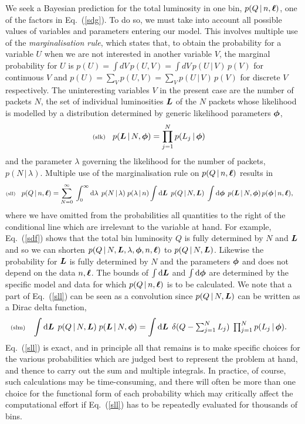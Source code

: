 \documentclass[11pt]{article}
\newcommand{\lleq}[1]{\label{#1} }
\renewcommand{\lleq}[1]{\label{#1} {\scriptstyle {\rm (#1)}} \hspace*{2ex} }
\newcommand{\cond}{\,|\,}
\newcommand{\refeq}[1]{Eq.~(\ref{#1})}
\newcommand{\rmdx}[1]{\dd{#1}} %
\begin{document}
We seek a Bayesian prediction for the total luminosity in one bin,
$p(Q\cond n,\bml)$, one of the factors in Eq.~(\ref{sdg}).  To do so,
we must take into account all possible values of variables and
parameters entering our model.  This involves multiple use of the
\textit{marginalisation rule}, which states that, to obtain the
probability for a variable $U$ when we are not interested in another
variable $V$, the marginal probability for $U$ is %
$p(U) = \int dV\,p(U,V) = \int dV\,p(U\cond V)\,p(V)$ for continuous
$V$ and $p(U) = \sum_V p(U,V) = \sum_V p(U\cond V)\,p(V)$ for discrete
$V$ respectively.
%
The uninteresting variables $V$ in the present case are the number of
packets $N$, the set of individual luminosities ${\bm{L}}$ of the $N$ packets
whose likelihood is modelled by a distribution determined by
generic likelihood parameters ${\bm{\phi}}$,
\begin{align}
  \lleq{slk}
  p(\bmL\cond N,\bmphi)
  &= \prod_{j=1}^{N} p(L_j\cond \bmphi)
\end{align}
and the parameter $\lambda$ governing the likelihood for the number of
packets, $p(N\cond\lambda)$. Multiple use of the marginalisation rule
on $p(Q\cond n,\bml)$ results in
\begin{align}
  \lleq{sll}
  p(Q\cond n,\bml)
  &= \sum_{N=0}^\infty \;\int_0^\infty \rmdx{\lambda}\;
    p(N\cond\lambda)\;
    p(\lambda\cond n)
    \int \rmdx{\bmL}\;
    p(Q\cond N,\bmL)\;
    \int \rmdx{\bmphi}\;
    p(\bmL\cond N,\bmphi)\,
    p(\bmphi\cond n,\bml),
\end{align}
where we have omitted from the probabilities all quantities to the
right of the conditional line which are irrelevant to the variable at
hand. For example, Eq.~(\ref{sdf}) shows that the total bin luminosity
$Q$ is fully determined by $N$ and ${\bm{L}}$ and so we can shorten
$p(Q\cond N,\bmL,\lambda,\bmphi,n,\bml)$ to $p(Q\cond N,\bmL)$. %
Likewise the probability for ${\bm{L}}$ is fully determined by $N$ and the
parameters ${\bm{\phi}}$ and does not depend on the data $n,{\bm{\ell}}$.  The
bounds of $\int \rmdx{\bmL}$ and $\int \rmdx{\bmphi}$ are determined by the
specific model and data for which $p(Q\cond n,\bml)$ is to be
calculated.
%
We note that a part of Eq.~(\ref{sll}) can be seen as a convolution
since $p(Q\cond N,\bmL)$ can be written as a Dirac delta function,
\begin{align}
  \lleq{slm}
  \int \rmdx{\bmL}\; p(Q\cond N,\bmL)\; p(\bmL\cond N,\bmphi)
  &= \int \rmdx{\bmL}\;\delta(Q - \textstyle\sum_{j=1}^N L_j)\; \prod_{j=1}^N p(L_j\cond \bmphi).
\end{align}
Eq.~(\ref{sll}) is exact, and in principle all that remains is to make
specific choices for the various probabilities which are judged best
to represent the problem at hand, and thence to carry out the sum and
multiple integrals. In practice, of course, such calculations may be
time-consuming, and there will often be more than one choice for the
functional form of each probability which may critically affect the
computational effort if \refeq{sll} has to be repeatedly evaluated for
thousands of bins.
\end{document}
